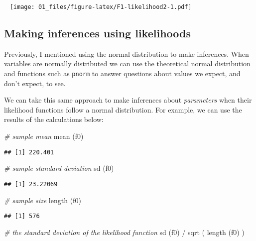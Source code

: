 \documentclass[
]{book}
\newenvironment{Shaded}{\begin{snugshade}}{\end{snugshade}}
\newcommand{\CommentTok}[1]{\textcolor[rgb]{0.56,0.35,0.01}{\textit{#1}}}
\newcommand{\FunctionTok}[1]{\textcolor[rgb]{0.00,0.00,0.00}{#1}}
\newcommand{\NormalTok}[1]{#1}
\newcommand{\SpecialCharTok}[1]{\textcolor[rgb]{0.00,0.00,0.00}{#1}}
\begin{document}
~
\texttt{[image: 01\_files/figure-latex/F1-likelihood2-1.pdf]}
~

\hypertarget{making-inferences-using-likelihoods}{%
\subsection{Making inferences using likelihoods}\label{making-inferences-using-likelihoods}}

Previously, I mentioned using the normal distribution to make inferences. When variables are normally distributed we can use the theoretical normal distribution and functions such as \texttt{pnorm} to answer questions about values we expect, and don't expect, to see.

We can take this same approach to make inferences about \emph{parameters} when their likelihood functions follow a normal distribution. For example, we can use the results of the calculations below:

\begin{Shaded}
\begin{Highlighting}[]
\CommentTok{\# sample mean}
\FunctionTok{mean}\NormalTok{ (f0)   }
\end{Highlighting}
\end{Shaded}

\begin{verbatim}
## [1] 220.401
\end{verbatim}

\begin{Shaded}
\begin{Highlighting}[]
\CommentTok{\# sample standard deviation}
\FunctionTok{sd}\NormalTok{ (f0)     }
\end{Highlighting}
\end{Shaded}

\begin{verbatim}
## [1] 23.22069
\end{verbatim}

\begin{Shaded}
\begin{Highlighting}[]
\CommentTok{\# sample size}
\FunctionTok{length}\NormalTok{ (f0)  }
\end{Highlighting}
\end{Shaded}

\begin{verbatim}
## [1] 576
\end{verbatim}

\begin{Shaded}
\begin{Highlighting}[]
\CommentTok{\# the standard deviation of the likelihood function}
\FunctionTok{sd}\NormalTok{ (f0) }\SpecialCharTok{/} \FunctionTok{sqrt}\NormalTok{ ( }\FunctionTok{length}\NormalTok{ (f0) ) }
\end{Highlighting}
\end{Shaded}
\end{document}

